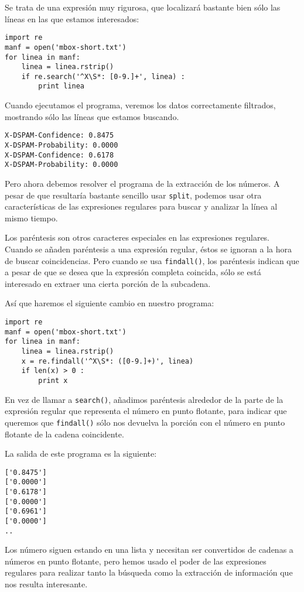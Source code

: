 Se trata de una expresión muy rigurosa, que localizará bastante bien sólo las líneas en las que
estamos interesados:

\beforeverb
\begin{verbatim}
import re
manf = open('mbox-short.txt')
for linea in manf:
    linea = linea.rstrip()
    if re.search('^X\S*: [0-9.]+', linea) :
        print linea
\end{verbatim}
\afterverb
%
Cuando ejecutamos el programa, veremos los datos correctamente filtrados,
mostrando sólo las líneas que estamos buscando.

\beforeverb
\begin{verbatim}
X-DSPAM-Confidence: 0.8475
X-DSPAM-Probability: 0.0000
X-DSPAM-Confidence: 0.6178
X-DSPAM-Probability: 0.0000
\end{verbatim}
\afterverb
%
Pero ahora debemos resolver el programa de la extracción de los números. A pesar de que resultaría
bastante sencillo usar {\tt split}, podemos usar otra características de las expresiones regulares para
buscar y analizar la línea al mismo tiempo.

Los paréntesis son otros caracteres especiales en las expresiones regulares. Cuando se añaden paréntesis
a una expresión regular, éstos se ignoran a la hora de buscar coincidencias. Pero cuando se usa
{\tt findall()}, los paréntesis indican que a pesar de que se desea que la expresión completa coincida,
sólo se está interesado en extraer una cierta porción de la subcadena.

Así que haremos el siguiente cambio en nuestro programa:

\beforeverb
\begin{verbatim}
import re
manf = open('mbox-short.txt')
for linea in manf:
    linea = linea.rstrip()
    x = re.findall('^X\S*: ([0-9.]+)', linea)
    if len(x) > 0 :
        print x
\end{verbatim}
\afterverb
%
En vez de llamar a {\tt search()}, añadimos paréntesis alrededor de la parte de la expresión regular
que representa el número en punto flotante, para indicar que queremos que {\tt findall()} sólo nos devuelva
la porción con el número en punto flotante de la cadena coincidente.

La salida de este programa es la siguiente:

\beforeverb
\begin{verbatim}
['0.8475']
['0.0000']
['0.6178']
['0.0000']
['0.6961']
['0.0000']
..
\end{verbatim}
\afterverb
%
Los número siguen estando en una lista y necesitan ser convertidos de cadenas a números en punto flotante, pero
hemos usado el poder de las expresiones regulares para realizar tanto la búsqueda como la extracción de información
que nos resulta interesante.

